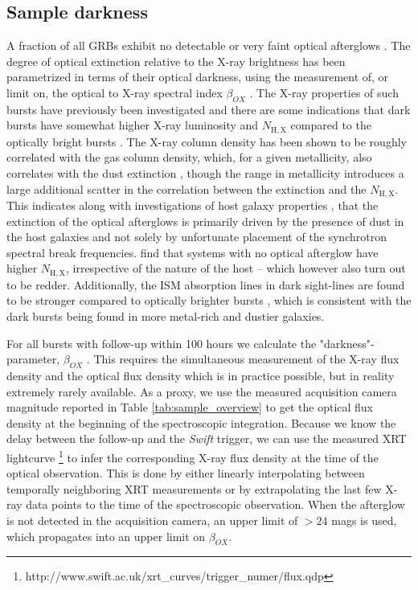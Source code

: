 \documentclass[longauth]{aa}    %
\begin{document}
\subsection{Sample darkness} \label{darkness}

A fraction of all GRBs exhibit no detectable or very faint optical afterglows
\citep{Groot1998, Djorgovski2001, Fynbo2001}. The degree of optical extinction
relative to the X-ray brightness has been parametrized in terms of their optical
darkness, using the measurement of, or limit on, the optical to X-ray spectral
index $\beta_{OX}$ \citep{Jakobsson2004, Rol2005, VanderHorst2009}. The X-ray
properties of such bursts have previously been investigated
\citep{DePasquale2003, Fynbo2009, Melandri2012} and there are some indications
that dark bursts have somewhat higher X-ray luminosity and $N_{\mathrm{H, X}}$
compared to the optically bright bursts \citep{Campana2012, Watson2012}. The
X-ray column density has been shown to be roughly correlated with the gas column
density, which, for a given metallicity, also correlates with the dust
extinction \citep{Watson2013, Covino2013a}, though the range in metallicity
introduces a large additional scatter in the correlation between the extinction
and the $N_{\mathrm{H, X}}$. This indicates along with investigations of host
galaxy properties \citep{Greiner2011, Kruhler2011, Hjorth2012, Perley2016b},
that the extinction of the optical afterglows is primarily driven by the
presence of dust in the host galaxies and not solely by unfortunate placement of
the synchrotron spectral break frequencies. \citet{Hjorth2012} find that systems
with no optical afterglow have higher $N_{\mathrm{H, X}}$, irrespective of the
nature of the host -- which however also turn out to be redder. Additionally,
the ISM absorption lines in dark sight-lines are found to be stronger compared
to optically brighter bursts \citep{Christensen2011a}, which is consistent with
the dark bursts being found in more metal-rich and dustier galaxies.

For all bursts with follow-up within 100 hours we calculate the
"darkness"-parameter, $\beta_{OX}$ \citep{Jakobsson2004}. This requires the
simultaneous measurement of the X-ray flux density and the optical flux density
which is in practice possible, but in reality extremely rarely available. As
a proxy, we use the measured acquisition camera magnitude reported in Table
\ref{tab:sample_overview} to get the optical flux density at the beginning of
the spectroscopic integration. Because we know the delay between the follow-up
and the \textit{Swift} trigger, we can use the measured XRT lightcurve
\citep{Evans2007,
	Evans2009}\footnote{http://www.swift.ac.uk/xrt\_curves/trigger\_numer/flux.qdp}
to infer the corresponding X-ray flux density at the time of the optical
observation. This is done by either linearly interpolating between temporally
neighboring XRT measurements or by extrapolating the last few X-ray data points
to the time of the spectroscopic observation. When the afterglow is not detected
in the acquisition camera, an upper limit of $> 24$ mags is used, which
propagates into an upper limit on $\beta_{OX}$.
\end{document}
